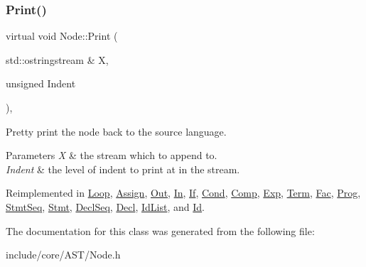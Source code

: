 \mbox{\label{class_node_a5325b760a6e6fe94227c0cff53af2c45}} 
\subsubsection{\texorpdfstring{Print()}{Print()}}
{\footnotesize\ttfamily virtual void Node\+::\+Print (\begin{DoxyParamCaption}\item[{std\+::ostringstream \&}]{X,  }\item[{unsigned}]{Indent }\end{DoxyParamCaption})\hspace{0.3cm}{\ttfamily [inline]}, {\ttfamily [virtual]}}

Pretty print the node back to the source language. 
\begin{DoxyParams}{Parameters}
{\em X} & the stream which to append to. \\
\hline
{\em Indent} & the level of indent to print at in the stream. \\
\hline
\end{DoxyParams}


Reimplemented in \mbox{\hyperlink{class_loop_aa2907209a033f57b7ca8bbee857b2bfe}{Loop}}, \mbox{\hyperlink{class_assign_a1739f537e350e577898ae2447f928e4a}{Assign}}, \mbox{\hyperlink{class_out_a3aefc50458c5e3f05e3e7419c93c8eb5}{Out}}, \mbox{\hyperlink{class_in_a309553a9aa17740ec97c110d8697e0a6}{In}}, \mbox{\hyperlink{class_if_a3a58cc0b16902cc935c9edce7fc70ff6}{If}}, \mbox{\hyperlink{class_cond_acb604011c472b21934e134c07f3cf0c1}{Cond}}, \mbox{\hyperlink{class_comp_abc0e0fdd3a8963d5d60017c38765d0b4}{Comp}}, \mbox{\hyperlink{class_exp_a1f5a3ad89d1aa43c746768d813582f39}{Exp}}, \mbox{\hyperlink{class_term_a36f292dd7bd0d04cb97ca97afd476fc7}{Term}}, \mbox{\hyperlink{class_fac_abf645b3e9acdc88dd83ed3dacf981c58}{Fac}}, \mbox{\hyperlink{class_prog_aadfb046d4096b256eea11e3171b8d399}{Prog}}, \mbox{\hyperlink{class_stmt_seq_aa9044b5fc51430f8da4d62b8c0beb8e7}{Stmt\+Seq}}, \mbox{\hyperlink{class_stmt_a7d29a5e877b3fa073d3c2e9da3effb27}{Stmt}}, \mbox{\hyperlink{class_decl_seq_a028dc9916d5ab8369117d90b9e7af7f8}{Decl\+Seq}}, \mbox{\hyperlink{class_decl_a2cd337f551b0a66d6787816c0a4a907a}{Decl}}, \mbox{\hyperlink{class_id_list_a1e2cd3692c956de8cebb88ffcaf0242f}{Id\+List}}, and \mbox{\hyperlink{class_id_a79e18030494873748efcaf6ea530a35f}{Id}}.



The documentation for this class was generated from the following file\+:\begin{DoxyCompactItemize}
\item 
include/core/\+A\+S\+T/Node.\+h\end{DoxyCompactItemize}
